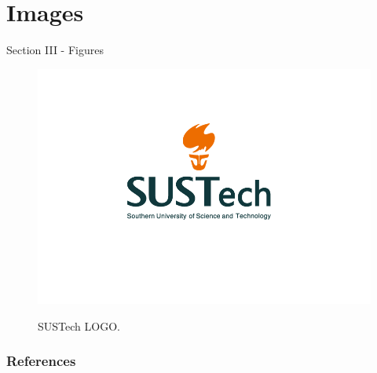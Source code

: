 \documentclass{libs/SUSTech_format}
\begin{document}

\section{Images}
\begin{frame}{Section III - Figures}
    \begin{figure}
        \centering
        \caption{SUSTech LOGO.}
        \includegraphics[scale=0.3]{libs/LOGO.png}
        \label{fig:ufc_emblem}
    \end{figure}
\end{frame}

\begin{frame}[allowframebreaks]
    \frametitle{References}
    \printbibliography
\end{frame}

\end{document}
